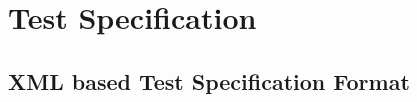 \documentclass[a4paper,twocolumn]{article}
\newcommand{\VMC}[0]{VMC®}
\begin{document}
%
%
%
%
%
%


\section{Test Specification}

\subsection{XML based Test Specification Format}
\end{document}
